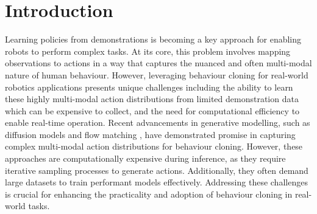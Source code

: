 
\section{Introduction}


Learning policies from demonstrations is becoming a key approach for enabling robots to perform complex tasks. At its core, this problem involves mapping observations to actions in a way that captures the nuanced and often multi-modal nature of human behaviour. However, leveraging behaviour cloning for real-world robotics applications presents unique challenges including the ability to learn these highly multi-modal action distributions from limited demonstration data which can be expensive to collect, and the need for computational efficiency to enable real-time operation. Recent advancements in generative modelling, such as diffusion models \cite{sohldickstein2015nonequilibrium, chi2023diffusion} and flow matching \cite{lipmanflow, black2024pi_0}, have demonstrated promise in capturing complex multi-modal action distributions for behaviour cloning. However, these approaches are computationally expensive during inference, as they require iterative sampling processes to generate actions. Additionally, they often demand large datasets to train performant models effectively. Addressing these challenges is crucial for enhancing the practicality and adoption of behaviour cloning in real-world tasks.


